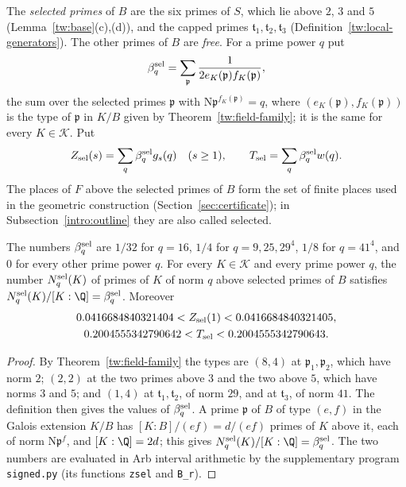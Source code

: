 \begin{definition}\label{an:selected-def}
The \emph{selected primes} of $B$ are the six primes of $S$, which lie above
$2$, $3$ and $5$ (Lemma~\ref{tw:base}(c),(d)), and the capped primes
$\mathfrak t_1,\mathfrak t_2,\mathfrak t_3$
(Definition~\ref{tw:local-generators}). The other primes of $B$ are
\emph{free}. For a prime power $q$ put
\[
 \beta^{\rm sel}_q=\sum_{\mathfrak p}\frac1{2e_K(\mathfrak p)f_K(\mathfrak p)},
\]
the sum over the selected primes $\mathfrak p$ with
$\mathrm N\mathfrak p^{f_K(\mathfrak p)}=q$, where
$(e_K(\mathfrak p),f_K(\mathfrak p))$ is the type of $\mathfrak p$ in $K/B$
given by Theorem~\ref{tw:field-family}; it is the same for every
$K\in\mathcal K$. Put
\[
 Z_{\rm sel}(s)=\sum_q\beta^{\rm sel}_qg_s(q)\quad(s\ge1),\qquad
 T_{\rm sel}=\sum_q\beta^{\rm sel}_qw(q).
\]
The places of $F$ above the selected primes of $B$ form the set of finite
places used in the geometric construction (Section~\ref{sec:certificate});
in Subsection~\ref{intro:outline} they are also called selected.
\end{definition}

\begin{lemma}\label{an:selected-lemma}
The numbers $\beta^{\rm sel}_q$ are $1/32$ for $q=16$, $1/4$ for
$q=9,25,29^4$, $1/8$ for $q=41^4$, and $0$ for every other prime power $q$.
For every $K\in\mathcal K$ and every prime power $q$, the number
$N^{\rm sel}_q(K)$ of primes of $K$ of norm $q$ above selected primes of
$B$ satisfies $N^{\rm sel}_q(K)/[K:\Q]=\beta^{\rm sel}_q$. Moreover
\begin{gather*}
 0.0416684840321404<Z_{\rm sel}(1)<0.0416684840321405,\\
 0.2004555342790642<T_{\rm sel}<0.2004555342790643.
\end{gather*}
\end{lemma}

\begin{proof}
By Theorem~\ref{tw:field-family} the types are $(8,4)$ at
$\mathfrak p_1,\mathfrak p_2$, which have norm $2$; $(2,2)$ at the two primes
above $3$ and the two above $5$, which have norms $3$ and $5$; and $(1,4)$ at
$\mathfrak t_1,\mathfrak t_2$, of norm $29$, and at $\mathfrak t_3$, of norm
$41$. The definition then gives the values of $\beta^{\rm sel}_q$. A prime
$\mathfrak p$ of $B$ of type $(e,f)$ in the Galois extension $K/B$ has
$[K:B]/(ef)=d/(ef)$ primes of $K$ above it, each of norm
$\mathrm N\mathfrak p^f$, and $[K:\Q]=2d$; this gives
$N^{\rm sel}_q(K)/[K:\Q]=\beta^{\rm sel}_q$. The two numbers are evaluated
in Arb interval arithmetic by the supplementary program \texttt{signed.py}
(its functions \texttt{zsel} and \texttt{B\_r}).
\end{proof}

